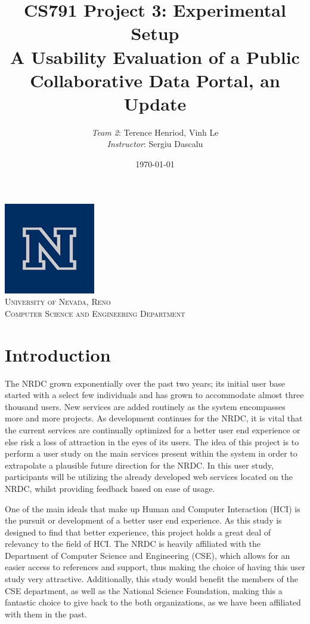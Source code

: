 \documentclass{article}
\title{CS791 Project 3: Experimental Setup \\ A Usability Evaluation of a Public Collaborative Data Portal, an Update}
\author{\emph{Team 2}: Terence Henriod, Vinh Le \\ \emph{Instructor}: Sergiu Dascalu}
\date{\today}
\begin{document}
\clearpage            %

\maketitle
\begin{center}
\includegraphics[scale=0.4]{unr-logo} \\[0.5cm]
\textsc{\Large University of Nevada, Reno} \\[0.5cm]
\textsc{\large Computer Science and Engineering Department} \\
\end{center}

\thispagestyle{empty} %

\vspace{10mm}

%
%
\newpage
\section{Introduction}
The NRDC grown exponentially over the past two years; its initial user base started with a select few individuals and has grown to accommodate almost three thousand users. New services are added routinely as the system encompasses more and more projects. As development continues for the NRDC, it is vital that the current services are continually optimized for a better user end experience or else risk a loss of attraction in the eyes of its users. The idea of this project is to perform a user study on the main services present within the system in order to extrapolate a plausible future direction for the NRDC. In this user study, participants will be utilizing the already developed web services located on the NRDC, whilst providing feedback based on ease of usage. 

One of the main ideals that make up Human and Computer Interaction (HCI) is the pursuit or development of a better user end experience. As this study is designed to find that better experience, this project holds a great deal of relevancy to the field of HCI. The NRDC is heavily affiliated with the Department of Computer Science and Engineering (CSE), which allows for an easier access to references and support, thus making the choice of having this user study very attractive. Additionally, this study would benefit the members of the CSE department, as well as the National Science Foundation, making this a fantastic choice to give back to the both organizations, as we have been affiliated with them in the past.
\end{document}
